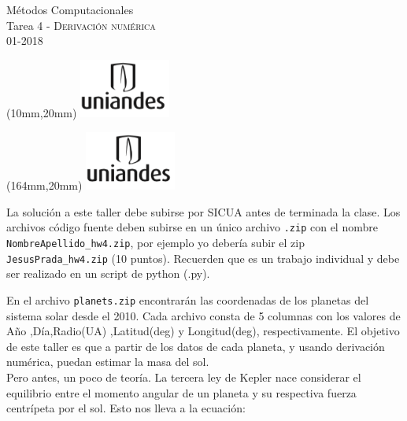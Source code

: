 \documentclass[11pt,letterpaper]{exam}
\begin{document}
\begin{center}
{\Large M\'etodos Computacionales} \\
Tarea 4 - \textsc{Derivaci\'on num\'erica}\\
01-2018\\
\end{center}

\begin{textblock*}{40mm}(10mm,20mm)
  \includegraphics[width=3cm]{logoUniandes}
\end{textblock*}

\begin{textblock*}{40mm}(164mm,20mm)
  \includegraphics[width=3cm]{logoUniandes}
\end{textblock*}

\vspace{0.3cm}

\noindent
La soluci\'on a este taller debe subirse por SICUA antes de terminada la clase.
\noindent
Los archivos c\'odigo fuente deben subirse en un \'unico archivo
\verb".zip" con el nombre \verb"NombreApellido_hw4.zip", por ejemplo
yo deber\'ia subir el zip \verb"JesusPrada_hw4.zip" (10 puntos). Recuerden que es un trabajo individual y debe ser realizado en un script de python (.py).

\vspace{0.3cm}

En el archivo \verb"planets.zip" encontrar\'an las coordenadas de los planetas del sistema solar desde el 2010. Cada archivo consta de 5 columnas con los valores de A\~no ,D\'ia,Radio(UA) ,Latitud(deg) y Longitud(deg), respectivamente. El objetivo de este taller es que a partir de los datos de cada planeta, y usando derivaci\'on num\'erica, puedan estimar la masa del sol.\\

Pero antes, un poco de teor\'ia. La tercera ley de Kepler nace considerar el equilibrio entre el momento angular de un planeta y su respectiva fuerza centr\'ipeta por el sol. Esto nos lleva a la ecuaci\'on:
\end{document}
